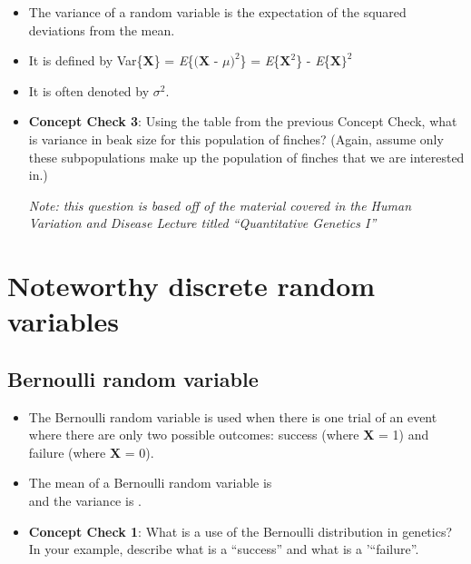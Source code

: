 \documentclass[12pt]{report}
\begin{document}
\begin{itemize}

\item The variance of a random variable is the expectation of the squared deviations from the mean.

\item It is defined by Var\{\textbf{X}\} =  \textit{E}\{$\big (\textbf{X - $\mu$}\big)^{2}$\} = \textit{E}\{$\textbf{X}^{2}$\} -  \textit{E}\{$\textbf{X}\}^{2}$

\item It is often denoted by $\sigma^{2}$.

\item \textbf{Concept Check 3}: Using the table from the previous Concept Check, what is variance in beak size for this population of finches? (Again, assume only these subpopulations make up the population of finches that we are interested in.)

\bigskip

\bigskip

\bigskip

\bigskip

\bigskip

\bigskip

\bigskip

\bigskip
\textit{Note: this question is based off of the material covered in the Human Variation and Disease Lecture titled ``Quantitative Genetics I''}


\end{itemize}

\section{Noteworthy discrete random variables}

\subsection{Bernoulli random variable}

\begin{itemize}

\item The Bernoulli random variable is used when there is one trial of an event where there are only two possible outcomes: success (where \textbf{X} = 1) and failure (where \textbf{X} = 0). 

\item The mean of a Bernoulli random variable is \hrulefill \\
and the variance is \hrulefill.

\item \textbf{Concept Check 1}: What is a use of the Bernoulli distribution in genetics? In your example, describe what is a ``success'' and what is a '``failure''.  

\end{itemize}
\bigskip
\end{document}
